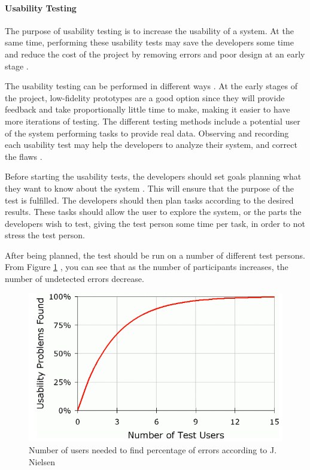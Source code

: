 \paragraph{Usability Testing}
The purpose of usability testing is to increase the usability of a system. At the same time, performing these usability tests may save the developers some time and reduce the cost of the project by removing errors and poor design at an early stage \cite{dumas1995practical}.

The usability testing can be performed in different ways \cite{schneidermanusercentered}. At the early stages of the project, low-fidelity prototypes are a good option since they will provide feedback and take proportionally little time to make, making it easier to have more iterations of testing. The different testing methods include a potential user of the system performing tasks to provide real data. Observing and recording each usability test may help the developers to analyze their system, and correct the flaws \cite{dumas1995practical}. 

Before starting the usability tests, the developers should set goals planning what they want to know about the system \cite{isosoftwareengineering}. This will ensure that the purpose of the test is fulfilled. The developers should then plan tasks according to the desired results. These tasks should allow the user to explore the system, or the parts the developers wish to test, giving the test person some time per task, in order to not stress the test person. 

After being planned, the test should be run on a number of different test persons. From Figure \ref{fig:numberoftests}
, you can see that as the number of participants increases, the number of undetected errors decrease. 



 \begin{figure}
 		\centering
 			\includegraphics[scale=0.4]{Pictures/app-screenshots/numberoftests.png}
 		\caption{Number of users needed to find percentage of errors according to J. Nielsen\cite{nielsennumberoftests}}
 		 		\label{fig:numberoftests}
 \end{figure}


